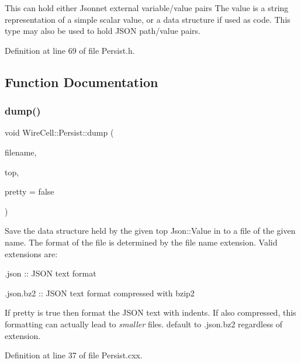This can hold either Jsonnet external variable/value pairs The value is a string representation of a simple scalar value, or a data structure if used as code. This type may also be used to hold J\+S\+ON path/value pairs. 

Definition at line 69 of file Persist.\+h.



\subsection{Function Documentation}
\mbox{\label{namespace_wire_cell_1_1_persist_a2acf48c85b54dfa84e3a42b610cdf780}} 
\subsubsection{\texorpdfstring{dump()}{dump()}}
{\footnotesize\ttfamily void Wire\+Cell\+::\+Persist\+::dump (\begin{DoxyParamCaption}\item[{const std\+::string \&}]{filename,  }\item[{const Json\+::\+Value \&}]{top,  }\item[{bool}]{pretty = {\ttfamily false} }\end{DoxyParamCaption})}

Save the data structure held by the given top Json\+::\+Value in to a file of the given name. The format of the file is determined by the file name extension. Valid extensions are\+:


\begin{DoxyItemize}
\item .json \+:\+: J\+S\+ON text format
\item .json.\+bz2 \+:\+: J\+S\+ON text format compressed with bzip2
\end{DoxyItemize}

If {\ttfamily pretty} is true then format the J\+S\+ON text with indents. If also compressed, this formatting can actually lead to {\itshape smaller} files. default to .json.\+bz2 regardless of extension. 

Definition at line 37 of file Persist.\+cxx.

